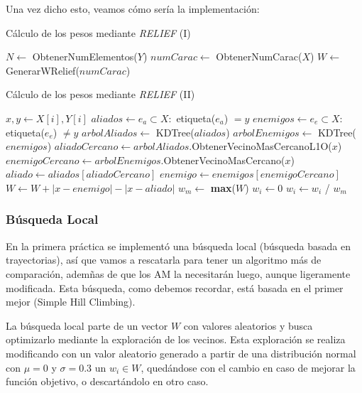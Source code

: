 \documentclass[11pt,a4paper]{article}
\begin{document}
Una vez dicho esto, veamos cómo sería la implementación:

\begin{algorithm}[H]
\caption{Cálculo de los pesos mediante \textit{RELIEF} (I)}
\begin{algorithmic}[1]
\State $N \gets$ ObtenerNumElementos($Y$)
\State $numCarac \gets $ ObtenerNumCarac($X$)
\State $W \gets $ GenerarWRelief($numCarac$)
\end{algorithmic}
\end{algorithm}

\begin{algorithm}[H]
\caption{Cálculo de los pesos mediante \textit{RELIEF} (II)}
\begin{algorithmic}
	\State $x, y \gets X[i], Y[i]$
	\State $aliados \gets e_a \subset X :$ etiqueta($e_a$) $ = y$
	\State $enemigos \gets e_e \subset X:$ etiqueta($e_e$) $ \neq y$
	\State $arbolAliados \gets$ KDTree($aliados$)
	\State $arbolEnemigos \gets$ KDTree($enemigos$)
	\State $aliadoCercano \gets arbolAliados$.ObtenerVecinoMasCercanoL1O($x$)
	\State $enemigoCercano \gets arbolEnemigos$.ObtenerVecinoMasCercano($x$)
	\State $aliado \gets aliados[aliadoCercano]$
	\State $enemigo \gets enemigos[enemigoCercano]$
	\State $W \gets W + \left|x - enemigo\right| - \left|x - aliado\right|$
\EndFor
\State $w_m \gets$ \textbf{max}($W$)
		\State $w_i \gets 0$
	\Else
		\State $w_i \gets w_i$ / $w_m$
	\EndIf
\EndFor
\State {}
\EndFunction
\end{algorithmic}
\end{algorithm}

\newpage

\subsubsection{Búsqueda Local}

En la primera práctica se implementó una búsqueda local (búsqueda basada en trayectorias), así que vamos a rescatarla para
tener un algoritmo más de comparación, ademñas de que los AM la necesitarán luego, aunque ligeramente modificada. Esta búsqueda,
como debemos recordar, está basada en el primer mejor (Simple Hill Climbing).

La búsqueda local parte de un vector $W$ con valores aleatorios y busca optimizarlo mediante la exploración de los vecinos.
Esta exploración se realiza modificando con un valor aleatorio generado a partir de una distribución normal con $\mu = 0$ y 
$\sigma = 0.3$ un $w_i \in W$, quedándose con el cambio en caso de mejorar la función objetivo, o descartándolo en otro caso.
\end{document}
